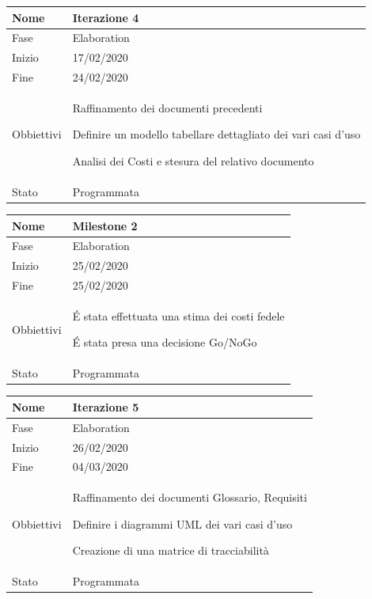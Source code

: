 \begin{center}
\begin{tabular}{ |p{}|p{}|  }
\hline
Nome & Iterazione 4 \\\hline
Fase & Elaboration \\\hline
Inizio & 17/02/2020 \\\hline
Fine &  24/02/2020 \\\hline
Obbiettivi & 
	\begin{compactitem}
		\item Raffinamento dei documenti precedenti
		\item Definire un modello tabellare dettagliato dei vari casi d'uso 
		\item Analisi dei Costi e stesura del relativo documento
	\end{compactitem}\\\hline
Stato &  Programmata \\\hline
\end{tabular}
\label{table:4}\newline

\begin{tabular}{ |p{2cm}|p{10cm}|  }
\hline
Nome & Milestone 2\\\hline
Fase & Elaboration \\\hline
Inizio & 25/02/2020 \\\hline
Fine &  25/02/2020 \\\hline
Obbiettivi & 
	\begin{compactitem}
		\item \'E stata effettuata una stima dei costi fedele
		\item \'E stata presa una decisione Go/NoGo
	\end{compactitem}\\\hline
Stato &  Programmata \\\hline
\end{tabular}
\label{table:milestone2}\newline

\begin{tabular}{ |p{2cm}|p{10cm}|  }
\hline
Nome & Iterazione 5 \\\hline
Fase & Elaboration \\\hline
Inizio & 26/02/2020 \\\hline
Fine &  04/03/2020  \\\hline
Obbiettivi & 
	\begin{compactitem}
		\item Raffinamento dei documenti Glossario, Requisiti
		\item Definire i diagrammi UML dei vari casi d'uso
		\item Creazione di una matrice di tracciabilità
	\end{compactitem}\\\hline
Stato &  Programmata \\\hline
\end{tabular}
\label{table:5}\newline


\end{center}
